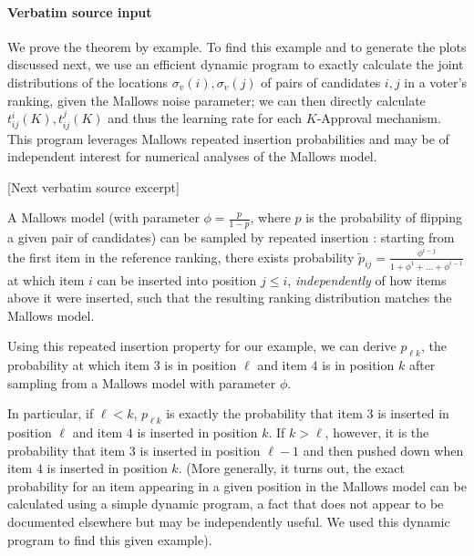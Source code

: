 \documentclass[10pt]{article}
\begin{document}
\paragraph{Verbatim source input}
\begin{ReviewVerbatim}
We prove the theorem by example. To find this example and to generate the plots discussed next, we use an efficient dynamic program to exactly calculate the joint distributions of the locations $\sigma_v(i),\sigma_v(j)$ of pairs of candidates $i,j$ in a voter's ranking, given the Mallows noise parameter; we can then directly calculate $t_{ij}^i(K), t_{ij}^j(K)$ and thus the learning rate for each $K$-Approval mechanism. This program leverages Mallows repeated insertion probabilities \cite{lu14a,diaconis_group_nodate} and may be of independent interest for numerical analyses of the Mallows model.

[Next verbatim source excerpt]

A Mallows model (with parameter $\phi = \frac{p}{1-p}$, where $p$ is the probability of flipping a given pair of candidates) can be sampled by repeated insertion \citep{lu14a,diaconis_group_nodate}: starting from the first item in the reference ranking, there exists probability $\tilde{p}_{ij} = \frac{\phi^{i-j}}{1 + \phi^1 + \dots + \phi^{i-1}}$ at which item $i$ can be inserted into position $j\leq i$, \textit{independently} of how items above it were inserted, such that the resulting ranking distribution matches the Mallows model.

Using this repeated insertion property for our example, we can derive $p_{\ell k}$, the probability at which item $3$ is in position $\ell$ and item $4$ is in position $k$ after sampling from a Mallows model with parameter $\phi$.

In particular, if $\ell < k$, $p_{\ell k}$ is exactly the probability that item $3$ is inserted in position $\ell$ and item $4$ is inserted in position $k$. If $k>\ell$, however, it is the probability that item $3$ is inserted in position $\ell - 1$ and then pushed down when item $4$ is inserted in position $k$. (More generally, it turns out, the exact probability for an item appearing in a given position in the Mallows model can be calculated using a simple dynamic program, a fact that does not appear to be documented  elsewhere but may be independently useful. We used this dynamic program to find this given example).
\end{ReviewVerbatim}
\end{document}
